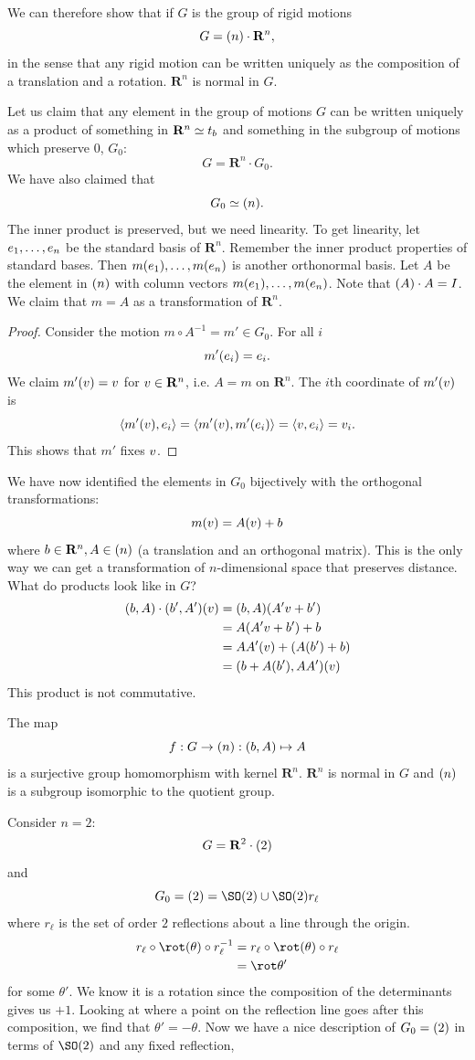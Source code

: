 \documentclass[11pt, oneside]{amsart}
\numberwithin{equation}{section}
\numberwithin{theorem}{section}
\theoremstyle{definition}
\let\O\relax
\let\bf\relax
\let\t\relax
\def\R{\mathbf{R}}
\begin{document}
We can therefore show that if $G$ is the group of rigid motions
$$
G = \O(n) \cdot \R^n,
$$
in the sense that any rigid motion can be written uniquely as the composition of a translation and a rotation. $\R^n$ is normal in $G$.

Let us claim that any element in the group of motions $G$ can be written uniquely as a product of something in $\R^n \simeq t_\bf{b}$ and something in the subgroup of motions which preserve 0, $G_0$:
$$
G = \R^n \cdot G_0.
$$
We have also claimed that
$$
G_0 \simeq \O(n).
$$
The inner product is preserved, but we need linearity. To get linearity, let $\bf e_1,\hdots,\bf e_n$ be the standard basis of $\R^n$. Remember the inner product properties of standard bases. Then $m(\bf e_1),\hdots,m(\bf e_n)$ is another orthonormal basis. Let $A$ be the element in $\O(n)$ with column vectors $m(\bf e_1),\hdots,m(\bf e_n)$. Note that $\t(A)\cdot A = I$. We claim that $m=A$ as a transformation of $\R^n$.
\begin{proof}
Consider the motion $m\circ A^{-1} = m'\in G_0$. For all $i$
$$
m'(\bf e_i) = \bf e_i.
$$
We claim $m'(\bf v) = \bf v$ for $\bf v \in \R^n$, i.e. $A=m $ on $\R^n$. The $i$th coordinate of $m'(\bf v)$ is $$\langle m'(\bf v), \bf e_i \rangle = \langle m'(\bf v), m'(\bf e_i)\rangle=\langle \bf v, \bf e_i\rangle=v_i.$$ This shows that $m'$ fixes $\bf v$.
\end{proof}

We have now identified the elements in $G_0$ bijectively with the orthogonal transformations:
$$
m(\bf v) = A(\bf v) + \bf b
$$
where $\bf b\in \R^n, A \in \O(n)$ (a translation and an orthogonal matrix). This is the only way we can get a transformation of $n$-dimensional space that preserves distance. What do products look like in $G$?
\begin{align*}
(\bf b, A) \cdot (\bf b', A') (\bf v)	&= (\bf b, A)(A' \bf v + \bf b')\\
						&= A(A'\bf v + \bf b')+\bf b\\
						&= AA'(\bf v) + (A(\bf b') + \bf b)\\
						&= (\bf b + A(\bf b'), AA')(\bf v)
\end{align*}
This product is not commutative. 

The map 
$$
f : G\to \O(n) : (\bf b, A)\mapsto A
$$
is a surjective group homomorphism with kernel $\R^n$. $\R^n$ is normal in $G$ and $\O(n)$ is a subgroup isomorphic to the quotient group.

Consider $n=2$:
$$
G = \R^2 \cdot\O(2)
$$
and 
$$
G_0 = \O(2) = \SO(2) \cup \SO(2)r_\ell
$$
where $r_\ell$ is the set of order $2$ reflections about a line through the origin.
\begin{align*}
r_\ell\circ \rot(\theta)\circ r_\ell^{-1}	&=r_\ell\circ \rot(\theta)\circ r_\ell \\
							&= \rot\theta ' 
\end{align*}
for some $\theta'$. We know it is a rotation since the composition of the determinants gives us $+1$. Looking at where a point on the reflection line goes after this composition, we find that $\theta' = -\theta$. Now we have a nice description of $G_0 = \O(2)$ in terms of $\SO(2)$ and any fixed reflection,
\end{document}
